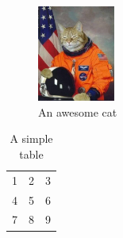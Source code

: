 \documentclass{article}
\begin{document}
\begin{figure}[h!]
  \centering
  \label{fig:astrocat}
  \caption{An awesome cat}
  \includegraphics[width=1in]{cat.jpg}
\end{figure}

\begin{table}[h!]
  \begin{center}
    \begin{tabular}{| lcr |}
    \hline
    1 & 2 & 3 \\
    4 & 5 & 6 \\
    7 & 8 & 9 \\
    \hline
    \end{tabular}
  \end{center}
  \caption{A simple table}
  \label{tab:simple}
\end{table}
\end{document}
